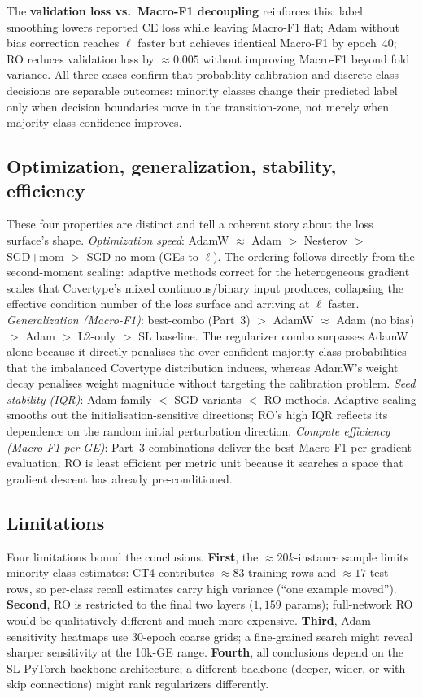 \documentclass[conference]{IEEEtran}
\begin{document}
The \textbf{validation loss vs.\ Macro-F1 decoupling} reinforces this:
label smoothing lowers reported CE loss while leaving Macro-F1 flat;
Adam without bias correction reaches $\ell$ faster but achieves identical
Macro-F1 by epoch~40; RO reduces validation loss by $\approx 0.005$ without
improving Macro-F1 beyond fold variance.
All three cases confirm that probability calibration and discrete class
decisions are separable outcomes: minority classes change their predicted
label only when decision boundaries move in the transition-zone, not
merely when majority-class confidence improves.

\subsection{Optimization, generalization, stability, efficiency}\label{sec:disc:ogse}
These four properties are distinct and tell a coherent story about the
loss surface's shape.
\textit{Optimization speed}: AdamW $\approx$ Adam $>$ Nesterov $>$ SGD+mom
$>$ SGD-no-mom (GEs to $\ell$).
The ordering follows directly from the second-moment scaling: adaptive methods
correct for the heterogeneous gradient scales that Covertype's mixed
continuous/binary input produces, collapsing the effective condition number
of the loss surface and arriving at $\ell$ faster.
\textit{Generalization (Macro-F1)}: best-combo (Part~3) $>$ AdamW $\approx$
Adam (no bias) $>$ Adam $>$ L2-only $>$ SL baseline.
The regularizer combo surpasses AdamW alone because it directly penalises
the over-confident majority-class probabilities that the imbalanced
Covertype distribution induces, whereas AdamW's weight decay penalises
weight magnitude without targeting the calibration problem.
\textit{Seed stability (IQR)}: Adam-family $<$ SGD variants $<$ RO methods.
Adaptive scaling smooths out the initialisation-sensitive directions; RO's
high IQR reflects its dependence on the random initial perturbation direction.
\textit{Compute efficiency (Macro-F1 per GE)}: Part~3 combinations deliver
the best Macro-F1 per gradient evaluation; RO is least efficient per metric
unit because it searches a space that gradient descent has already
pre-conditioned.

\subsection{Limitations}\label{sec:disc:limits}
Four limitations bound the conclusions.
\textbf{First}, the $\approx 20k$-instance sample limits minority-class estimates:
CT4 contributes $\approx 83$ training rows and $\approx 17$ test rows, so
per-class recall estimates carry high variance (``one example moved'').
\textbf{Second}, RO is restricted to the final two layers ($1{,}159$ params);
full-network RO would be qualitatively different and much more expensive.
\textbf{Third}, Adam sensitivity heatmaps use 30-epoch coarse grids; a
fine-grained search might reveal sharper sensitivity at the 10k-GE range.
\textbf{Fourth}, all conclusions depend on the SL PyTorch backbone
architecture; a different backbone (deeper, wider, or with skip connections)
might rank regularizers differently.
\end{document}
